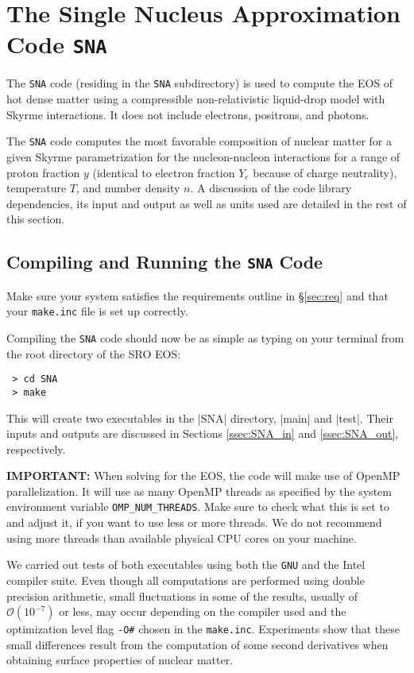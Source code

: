 \documentclass[letterpaper,11pt]{refart}
\begin{document}
\section{The Single Nucleus Approximation Code \texttt{SNA}}\label{sec:SNA}

The \texttt{SNA} code (residing in the \texttt{SNA} subdirectory) is
used to compute the EOS of hot dense matter using a compressible
non-relativistic liquid-drop model with Skyrme interactions. It does
not include electrons, positrons, and photons.

The \texttt{SNA} code computes the most favorable composition of
nuclear matter for a given Skyrme parametrization for the
nucleon-nucleon interactions for a range of proton fraction $y$
(identical to electron fraction $Y_e$ because of charge neutrality),
temperature $T$, and number density $n$. A discussion of the code
library dependencies, its input and output as well as units used are
detailed in the rest of this section.


\subsection{Compiling and Running the \texttt{SNA} Code}\label{ssec:SNA_dep}

Make sure your system satisfies the requirements outline in
\S\ref{sec:req} and that your \texttt{make.inc} file is set up
correctly.

Compiling the \verb|SNA| code should now be as simple as typing on
your terminal from the root directory of the SRO EOS:

\begin{verbatim}
 > cd SNA
 > make
\end{verbatim}


This will create two executables in the \verbfile|SNA| directory,
\verbexec|main| and \verbexec|test|.  Their inputs and outputs are
discussed in Sections \ref{ssec:SNA_in} and \ref{ssec:SNA_out},
respectively.

\textbf{IMPORTANT:} When solving for the EOS, the code will make use
of OpenMP parallelization. It will use as many OpenMP threads as
specified by the system environment variable
\texttt{OMP\_NUM\_THREADS}. Make sure to check what this is set to and
adjust it, if you want to use less or more threads. We do not
recommend using more threads than available physical CPU cores on your
machine.



We carried out tests of both executables using both the \texttt{GNU}
and the Intel compiler suite.  Even though all computations are
performed using double precision arithmetic, small fluctuations in
some of the results, usually of $\mathcal{O}(10^{-7})$ or less, may
occur depending on the compiler used and the optimization level flag
\verb|-O#| chosen in the \texttt{make.inc}. Experiments show that
these small differences result from the computation of some second
derivatives when obtaining surface properties of nuclear matter.
\end{document}
